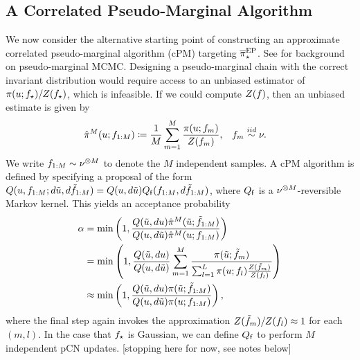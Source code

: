 \documentclass[12pt]{article}
\begin{document}
\subsection{A Correlated Pseudo-Marginal Algorithm}
We now consider the alternative starting point of constructing an 
approximate correlated pseudo-marginal algorithm (cPM) targeting ${\overline{\pi}}_{\star}^{\mathrm{EP}}$. 
See \citet{pseudoMarginalMCMC,pseudoMarginalEfficiency,corrPM}
for background on pseudo-marginal MCMC.
Designing a pseudo-marginal chain with the correct invariant distribution would 
require access to an unbiased estimator of
$\pi(u; {f}_{\star})/Z({f}_{\star})$, which is infeasible.
If we could compute $Z(f)$, then an unbiased
estimate is given by
 \begin{align}
&\hat{\pi}^M(u; f_{1:M}) \coloneqq \frac{1}{M} \sum_{m=1}^{M} \frac{\pi(u; f_m)}{Z(f_m)},
&&f_m \overset{iid}{\sim} \nu.
\end{align}
We write $f_{1:M} \sim \nu^{\otimes M}$ to denote the $M$ independent samples.
A cPM algorithm is defined by specifying a proposal of the form 
$Q(u, f_{1:M}; d\tilde{u}, d\tilde{f}_{1:M}) = 
Q(u, d\tilde{u}) Q_{\mathsf{f}}(f_{1:M}, d\tilde{f}_{1:M})$, where 
$Q_{\mathsf{f}}$ is a $\nu^{\otimes M}$-reversible Markov kernel. This yields an acceptance probability
\begin{align}
\alpha &= 
\min\left(1, \frac{Q(\tilde{u}, du)\hat{\pi}^M(\tilde{u}; \tilde{f}_{1:M})}{Q(u, d\tilde{u})\hat{\pi}^M(u; f_{1:M})} \right) \\
&= \min\left(1, 
\frac{Q(\tilde{u}, du)}{Q(u, d\tilde{u})}
\sum_{m=1}^{M} \frac{\pi(\tilde{u}; \tilde{f}_m)}{\sum_{l=1}^{L} \pi(u; f_l) 
\frac{Z(\tilde{f}_m)}{Z(f_l)}}
\right) \\
&\approx
\min\left(1, \frac{Q(\tilde{u}, du)\pi(\tilde{u}; \tilde{f}_{1:M})}{Q(u, d\tilde{u})\pi(u; f_{1:M})} \right),
\end{align}
where the final step again invokes the approximation $Z(\tilde{f}_m)/Z(f_l) \approx 1$ for each $(m,l)$. 
In the case that ${f}_{\star}$ is Gaussian, we can define $Q_{\mathsf{f}}$ to perform $M$ independent pCN updates.
[stopping here for now, see notes below]
\end{document}
